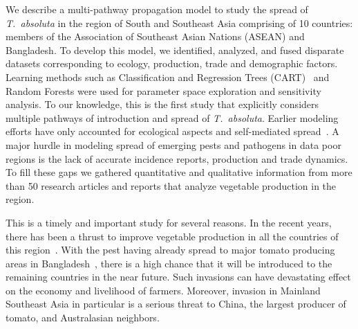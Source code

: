 \documentclass[11pt]{article}
\newcommand{\tuta}{\emph{T.~absoluta}}
\theoremstyle{definition}
\begin{document}
We describe a multi-pathway propagation model 
to study the spread of \tuta{} in the region of South
and Southeast Asia comprising of 10 countries: members of the Association
of Southeast Asian Nations (ASEAN) and Bangladesh. To develop this model,
we identified, analyzed, and fused disparate datasets corresponding to
ecology,  
production, trade 
and demographic factors. 
Learning methods such as Classification and Regression Trees
(CART)~\cite{breiman2017classification} and Random Forests were used for
parameter space exploration and sensitivity analysis.  To our knowledge,
this is the first study that explicitly considers multiple pathways of
introduction and spread of \tuta{}.  Earlier modeling efforts have only
accounted for ecological aspects and self-mediated
spread~\cite{desneux2010biological,tonnang2015identification,guimapi2016modeling}.
A major hurdle in modeling spread of emerging pests and pathogens in data
poor regions is the lack of accurate incidence reports, production and
trade dynamics. To fill these gaps we gathered quantitative and
qualitative information from more than 50 research articles and reports
that analyze vegetable production in the region.



This is a timely and important study for several reasons. In the recent
years, there has been a thrust to improve vegetable production in all the
countries of this region~\cite{ali2001}. With the pest having
already spread to major tomato producing areas in
Bangladesh~\cite{hossain2016first}, there is a high chance that it will be
introduced to the remaining countries in the near future. Such invasions
can have devastating effect on the economy and livelihood of farmers.
Moreover, invasion in Mainland Southeast Asia in particular is a serious
threat to China, the largest producer of tomato, and Australasian
neighbors.

\end{document}
